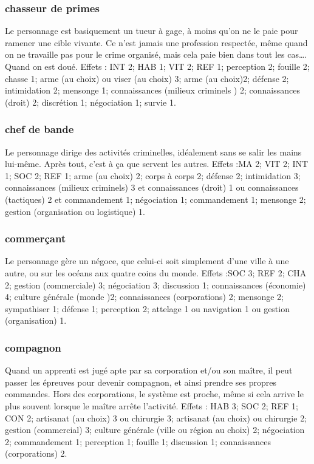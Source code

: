 \documentclass[10pt,a4paper,twocolumn]{book}
\begin{document}
\subsubsection{chasseur de primes}
Le personnage est basiquement un tueur à gage, à moins qu’on ne le paie pour ramener une cible vivante. Ce n’est jamais une profession respectée, même quand on ne travaille pas pour le crime organisé, mais cela paie bien dans tout les cas…. Quand on est doué.
Effets : INT 2; HAB 1; VIT 2; REF 1; perception 2; fouille 2; chasse 1; arme (au choix) ou viser (au choix) 3; arme (au choix)2; défense 2; intimidation 2; mensonge 1; connaissances (milieux criminels ) 2; connaissances (droit) 2; discrétion 1; négociation 1; survie 1.
\subsubsection{chef de bande}
Le personnage dirige des activités criminelles, idéalement sans se salir les mains lui-même. Après tout, c’est à ça que servent les autres. 
Effets :MA 2; VIT 2; INT 1; SOC 2; REF 1; arme (au choix) 2; corps à corps 2; défense 2; intimidation 3; connaissances (milieux criminels) 3 et connaissances (droit) 1 ou connaissances (tactiques) 2 et commandement 1; négociation 1; commandement 1; mensonge 2; gestion (organisation ou logistique) 1.
\subsubsection{commerçant}
Le personnage gère un négoce, que celui-ci soit simplement d’une ville à une autre, ou sur les océans aux quatre coins du monde.
Effets :SOC 3; REF 2; CHA 2; gestion (commerciale) 3; négociation 3; discussion 1; connaissances (économie) 4; culture générale (monde )2; connaissances (corporations) 2; mensonge 2; sympathiser 1; défense 1; perception 2; attelage 1 ou navigation 1 ou gestion (organisation) 1.  

\subsubsection{compagnon}
Quand un apprenti est jugé apte par sa corporation et/ou son maître, il peut passer les épreuves pour devenir compagnon, et ainsi prendre ses propres commandes. Hors des corporations, le système est proche, même si cela arrive le plus souvent lorsque le maître arrête l’activité.
Effets : HAB 3; SOC 2; REF 1; CON 2; artisanat (au choix) 3 ou chirurgie 3; artisanat (au choix) ou chirurgie 2; gestion (commercial) 3; culture générale (ville ou région au choix) 2; négociation 2; commandement 1; perception 1; fouille 1; discussion 1; connaissances (corporations) 2.
\end{document}
